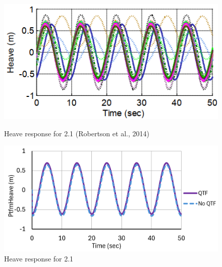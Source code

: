 \documentclass[a4paper, 11pt]{article}
\begin{document}
\begin{figure}[H]
    \begin{minipage}{0.48\textwidth}
        \centering
        \includegraphics[width=1\textwidth]{2.1_heave.png}
        \caption{\small Heave response for 2.1 (Robertson et al., 2014)}
        \label{fig:2.1_heave}
    \end{minipage}
    \hfill
    \begin{minipage}{0.51\textwidth}
        \centering
        \vspace{-0.3cm}
        \includegraphics[width=1\textwidth]{2.1_heave_mine.png}
        \caption{\small Heave response for 2.1}
        \label{fig:2.1_heave_mine}
    \end{minipage}
\end{figure}
\end{document}
